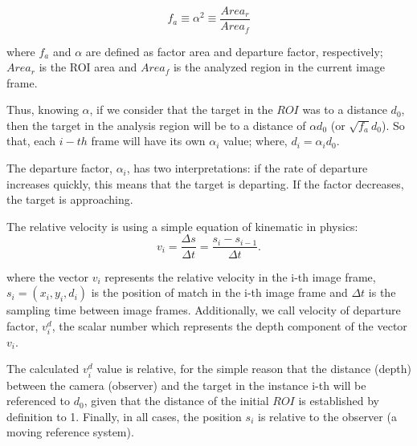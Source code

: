 \begin{equation}\label{eq:relarea}
f_a \equiv \alpha^2 \equiv \frac{Area_r}{Area_f} 
\end{equation}

where $f_a$ and $\alpha$ are defined as factor area and departure factor, 
respectively; $Area_r$ is the ROI area and $Area_f$ 
is the analyzed region in the current image frame.

Thus, knowing $\alpha$, if we consider that the target in the $ROI$ was to a distance $d_0$,
then the target in the analysis region will be to a distance of $\alpha d_0$ (or $\sqrt{f_a} d_0$).
So that, each $i-th$ frame will have its own $\alpha_i$ value; where, $d_i=\alpha_i d_0$.

The departure factor, $\alpha_i$, has two interpretations: if the rate of departure increases quickly, 
this  means that the target is departing. If the factor decreases, the 
target is approaching.

The relative velocity is using a simple equation of kinematic in physics:
\begin{equation}
 v_i = \frac{\Delta s}{\Delta t}= \frac{s_i-s_{i-1}}{\Delta t}.
\end{equation}

where the vector $v_i$ represents the relative velocity in the i-th image frame, 
$s_i=(x_i,y_i,d_i)$ is the position of match in the i-th image frame
and $\Delta t$ is the sampling time between image frames.
Additionally, we call velocity of departure factor, $v^d_i$, 
the scalar number which represents the depth component
of the vector $v_i$.

The calculated  $v^d_i$ value is relative, for the simple reason that the distance (depth) between the 
camera (observer) and the target in the instance i-th will be referenced to $d_0$, 
given that the distance of the initial $ROI$ is established by definition to 1.
Finally, in all cases, the position $s_i$ is relative to the observer (a moving reference system).

